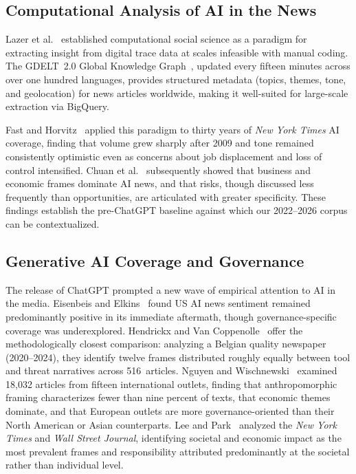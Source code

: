 \documentclass[sigconf]{acmart}
\begin{document}
\subsection{Computational Analysis of AI in the News}

Lazer et al.~\cite{lazer_computational_2009} established computational social science as a paradigm for extracting insight from digital trace data at scales infeasible with manual coding.
The GDELT~2.0 Global Knowledge Graph~\cite{kalev_gdelt_2013}, updated every fifteen minutes across over one hundred languages, provides structured metadata (topics, themes, tone, and geolocation) for news articles worldwide, making it well-suited for large-scale extraction via BigQuery.

Fast and Horvitz~\cite{fast_long-term_2017} applied this paradigm to thirty years of \emph{New York Times} AI coverage, finding that volume grew sharply after 2009 and tone remained consistently optimistic even as concerns about job displacement and loss of control intensified.
Chuan et al.~\cite{chuan_framing_2019} subsequently showed that business and economic frames dominate AI news, and that risks, though discussed less frequently than opportunities, are articulated with greater specificity.
These findings establish the pre-ChatGPT baseline against which our 2022--2026 corpus can be contextualized.

\subsection{Generative AI Coverage and Governance}

The release of ChatGPT prompted a new wave of empirical attention to AI in the media.
Eisenbeis and Elkins~\cite{eisenbeis_ai_2024} found US AI news sentiment remained predominantly positive in its immediate aftermath, though governance-specific coverage was underexplored.
Hendrickx and Van Coppenolle~\cite{hendrickx_tool_2026} offer the methodologically closest comparison: analyzing a Belgian quality newspaper (2020--2024), they identify twelve frames distributed roughly equally between tool and threat narratives across 516~articles.
Nguyen and Wischnewski~\cite{nguyen_generative_2026} examined 18,032 articles from fifteen international outlets, finding that anthropomorphic framing characterizes fewer than nine percent of texts, that economic themes dominate, and that European outlets are more governance-oriented than their North American or Asian counterparts.
Lee and Park~\cite{lee_framing_2026} analyzed the \emph{New York Times} and \emph{Wall Street Journal}, identifying societal and economic impact as the most prevalent frames and responsibility attributed predominantly at the societal rather than individual level.
\end{document}

